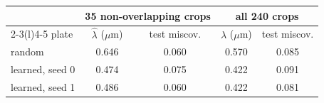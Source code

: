 \begin{tabular}{@{}l cc cc@{}}\toprule
 & \multicolumn{2}{c}{35 non-overlapping crops} & \multicolumn{2}{c}{all 240 crops}\\
\cmidrule(lr){2-3}\cmidrule(l){4-5}
plate & $\hat\lambda$ ($\mu$m) & test miscov. & $\hat\lambda$ ($\mu$m) & test miscov.\\\midrule
random & 0.646 & 0.060 & 0.570 & 0.085\\
learned, seed 0 & 0.474 & 0.075 & 0.422 & 0.091\\
learned, seed 1 & 0.486 & 0.060 & 0.422 & 0.081\\
\bottomrule\end{tabular}
